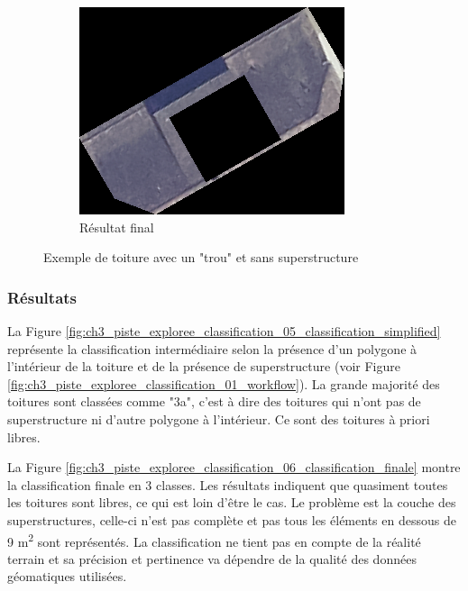 \begin{figure}[H]
    \vspace{0.35cm} %
    
    \begin{subfigure}[b]{0.48\textwidth}
        \centering
        \includegraphics[width=\textwidth]{02-main/figures/ch3/ch3_piste_exploree_classification_04_image_resultante.png}
        \caption{Résultat final}
        \label{fig:ch3_piste_exploree_classification_04_image_resultante}
    \end{subfigure}

    \caption{Exemple de toiture avec un "trou" et sans superstructure}
    \label{fig:piste_exploree_classification_image_exemple}
\end{figure}

\subsubsection{Résultats}

La Figure \ref{fig:ch3_piste_exploree_classification_05_classification_simplified} représente la classification intermédiaire selon la présence d'un polygone à l'intérieur de la toiture et de la présence de superstructure (voir Figure \ref{fig:ch3_piste_exploree_classification_01_workflow}). La grande majorité des toitures sont classées comme "3a", c'est à dire des toitures qui n'ont pas de superstructure ni d'autre polygone à l'intérieur. Ce sont des toitures à priori libres.

La Figure \ref{fig:ch3_piste_exploree_classification_06_classification_finale} montre la classification finale en 3 classes. Les résultats indiquent que quasiment toutes les toitures sont libres, ce qui est loin d'être le cas. Le problème est la couche des superstructures, celle-ci n'est pas complète et pas tous les éléments en dessous de 9 \si{\unit{\square\meter}} sont représentés. La classification ne tient pas en compte de la réalité terrain et sa précision et pertinence va dépendre de la qualité des données géomatiques utilisées.

